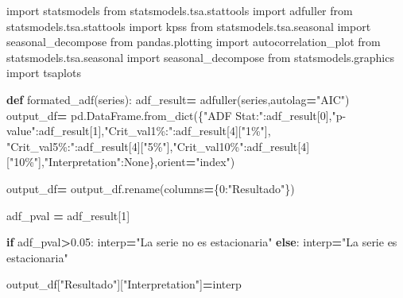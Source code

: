\documentclass[
]{book}
\newenvironment{Shaded}{\begin{snugshade}}{\end{snugshade}}
\newcommand{\ControlFlowTok}[1]{\textcolor[rgb]{0.13,0.29,0.53}{\textbf{#1}}}
\newcommand{\DecValTok}[1]{\textcolor[rgb]{0.00,0.00,0.81}{#1}}
\newcommand{\FloatTok}[1]{\textcolor[rgb]{0.00,0.00,0.81}{#1}}
\newcommand{\ImportTok}[1]{#1}
\newcommand{\KeywordTok}[1]{\textcolor[rgb]{0.13,0.29,0.53}{\textbf{#1}}}
\newcommand{\NormalTok}[1]{#1}
\newcommand{\OperatorTok}[1]{\textcolor[rgb]{0.81,0.36,0.00}{\textbf{#1}}}
\newcommand{\StringTok}[1]{\textcolor[rgb]{0.31,0.60,0.02}{#1}}
\newcommand{\VariableTok}[1]{\textcolor[rgb]{0.00,0.00,0.00}{#1}}
\begin{document}
\begin{Shaded}
\begin{Highlighting}[]

\ImportTok{import}\NormalTok{ statsmodels}
\ImportTok{from}\NormalTok{ statsmodels.tsa.stattools }\ImportTok{import}\NormalTok{ adfuller}
\ImportTok{from}\NormalTok{ statsmodels.tsa.stattools }\ImportTok{import}\NormalTok{ kpss}
\ImportTok{from}\NormalTok{ statsmodels.tsa.seasonal }\ImportTok{import}\NormalTok{ seasonal\_decompose}
\ImportTok{from}\NormalTok{ pandas.plotting }\ImportTok{import}\NormalTok{ autocorrelation\_plot}
\ImportTok{from}\NormalTok{ statsmodels.tsa.seasonal }\ImportTok{import}\NormalTok{ seasonal\_decompose}
\ImportTok{from}\NormalTok{ statsmodels.graphics }\ImportTok{import}\NormalTok{ tsaplots}


\KeywordTok{def}\NormalTok{ formated\_adf(series):}
\NormalTok{    adf\_result}\OperatorTok{=}\NormalTok{ adfuller(series,autolag}\OperatorTok{=}\StringTok{"AIC"}\NormalTok{)}
\NormalTok{    output\_df}\OperatorTok{=}\NormalTok{ pd.DataFrame.from\_dict(\{}\StringTok{"ADF Stat:"}\NormalTok{:adf\_result[}\DecValTok{0}\NormalTok{],}\StringTok{"p{-}value"}\NormalTok{:adf\_result[}\DecValTok{1}\NormalTok{],}\StringTok{"Crit\_val1\%:"}\NormalTok{:adf\_result[}\DecValTok{4}\NormalTok{][}\StringTok{"1\%"}\NormalTok{],}
                            \StringTok{"Crit\_val5\%:"}\NormalTok{:adf\_result[}\DecValTok{4}\NormalTok{][}\StringTok{"5\%"}\NormalTok{],}\StringTok{"Crit\_val10\%"}\NormalTok{:adf\_result[}\DecValTok{4}\NormalTok{][}\StringTok{"10\%"}\NormalTok{],}\StringTok{"Interpretation"}\NormalTok{:}\VariableTok{None}\NormalTok{\},orient}\OperatorTok{=}\StringTok{"index"}\NormalTok{)}
    
\NormalTok{    output\_df}\OperatorTok{=}\NormalTok{ output\_df.rename(columns}\OperatorTok{=}\NormalTok{\{}\DecValTok{0}\NormalTok{:}\StringTok{"Resultado"}\NormalTok{\})}

\NormalTok{    adf\_pval }\OperatorTok{=}\NormalTok{ adf\_result[}\DecValTok{1}\NormalTok{]}
    
    \ControlFlowTok{if}\NormalTok{ adf\_pval}\OperatorTok{\textgreater{}}\FloatTok{0.05}\NormalTok{:}
\NormalTok{        interp}\OperatorTok{=}\StringTok{"La serie no es estacionaria"}
    \ControlFlowTok{else}\NormalTok{:}
\NormalTok{        interp}\OperatorTok{=}\StringTok{"La serie es estacionaria"}
    
\NormalTok{    output\_df[}\StringTok{"Resultado"}\NormalTok{][}\StringTok{"Interpretation"}\NormalTok{]}\OperatorTok{=}\NormalTok{interp}


\end{Highlighting}
\end{Shaded}
\end{document}

